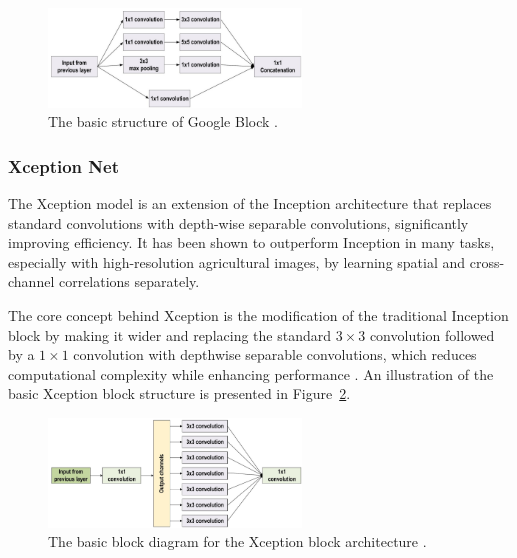 \begin{figure}[H] %
    \centering
    \includegraphics[width=0.6\textwidth]{chapters/chapter1/images/Figure09.png}
    \caption{The basic structure of Google Block \parencite{alzubaidi2021review}.}
    \label{fig:figure09}
\end{figure}

\subsubsection{Xception Net}

The Xception model is an extension of the Inception architecture that replaces standard convolutions with depth-wise separable convolutions, significantly improving efficiency. It has been shown to outperform Inception in many tasks, especially with high-resolution agricultural images, by learning spatial and cross-channel correlations separately.

The core concept behind Xception is the modification of the traditional Inception block by making it wider and replacing the standard $3 \times 3$ convolution followed by a $1 \times 1$ convolution with depthwise separable convolutions, which reduces computational complexity while enhancing performance \parencite{alzubaidi2021review}. An illustration of the basic Xception block structure is presented in Figure~\ref{fig:figure10}.


\begin{figure}[H] %
    \centering
    \includegraphics[width=0.6\textwidth]{chapters/chapter1/images/Figure10.png}
    \caption{The basic block diagram for the Xception block architecture \parencite{alzubaidi2021review}.}
    \label{fig:figure10}
\end{figure}

